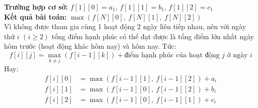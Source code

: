 \textbf{Trường hợp cơ sở:} $f[1][0] = a_1$, $f[1][1] = b_1$, $f[1][2] = c_1$\\

\textbf{Kết quả bài toán:} $\max \left( f[N][0],\ f[N][1],\ f[N][2] \right)$\\

Vì không được tham gia cùng 1 hoạt động 2 ngày liên tiếp nhau, nên với ngày thứ $i$ $(i \geq 2)$ tổng điểm hạnh phúc có thể đạt được là tổng điểm lớn nhất ngày hôm trước (hoạt động khác hôm nay) và hôm nay. Tức: 
\[
f[i][j] = \max_{k \ne j} \left( f[i-1][k] \right) + \text{điểm hạnh phúc của hoạt động $j$ ở ngày $i$}
\]
Hay:
\[
\begin{aligned}
f[i][0] &= \max \left( f[i-1][1],\ f[i-1][2] \right) + a_i \\
f[i][1] &= \max \left( f[i-1][0],\ f[i-1][2] \right) + b_i \\
f[i][2] &= \max \left( f[i-1][0],\ f[i-1][1] \right) + c_i \\
\end{aligned}
\]


